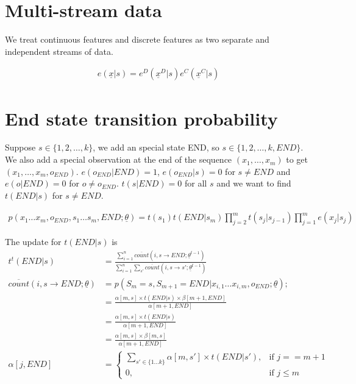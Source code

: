 \section{Multi-stream data}
We treat continuous features and discrete features as two separate and
independent streams of data.

\begin{align}
e(\underline{x}|s) = e^D(\underline{x}^D|s) e^C(\underline{x}^C|s)
\end{align}

\section{End state transition probability}
Suppose $s\in \{1, 2, \ldots, k\}$, we add an special state END, so 
$s\in \{1, 2, \ldots, k, END \}$. We also add a special observation at the end
of the sequence $(x_1, \ldots, x_m)$ to get $(x_1, \ldots, x_m, o_{END})$. 
$e(o_{END} | END) = 1$, $e(o_{END} | s) = 0$ for $s\neq END$ and $e(o | END) = 0$
for $o \neq o_{END}$. $t(s | END) = 0$ for all $s$ and we want to find $t(END | s)$ for
$s\neq END$.

\begin{align}
p(x_1\ldots x_m, o_{END}, s_1\ldots s_m, END;\underline{\theta}) = 
    t(s_1)t(END|s_m)\prod_{j = 2}^m t(s_j | s_{j-1})\prod_{j = 1}^m e(x_j|s_j)
\end{align} 

The update for $t(END|s)$ is
\begin{align}
t^t(END|s) &= \frac{\sum_{i = 1}^n \overline{count}(i, s\rightarrow END;\underline{\theta}^{t-1})}
    {\sum_{i = 1}^n\sum_{s'} \overline{count}(i, s\rightarrow s';\underline{\theta}^{t-1})} \\
\overline{count}(i, s\rightarrow END;\underline{\theta}) &= p(S_m = s, S_{m + 1} = END | x_{i, 1}\ldots x_{i, m}, o_{END}; \underline{\theta});\\
    &= \frac{\alpha[m, s]\times t(END|s)\times \beta[m + 1, END]}{\alpha[m + 1, END]}\\
    &= \frac{\alpha[m, s]\times t(END|s)}{\alpha[m + 1, END]}\\
    &= \frac{\alpha[m, s]\times \beta[m, s]}{\alpha[m + 1, END]}\\
\alpha[j, END] &= 
\begin{cases}
\sum_{s'\in\{1\ldots k\}}\alpha[m, s']\times t(END|s'), & \text{if } j == m + 1 \\
0, & \text{if } j\leq m
\end{cases} \\
\end{align}

